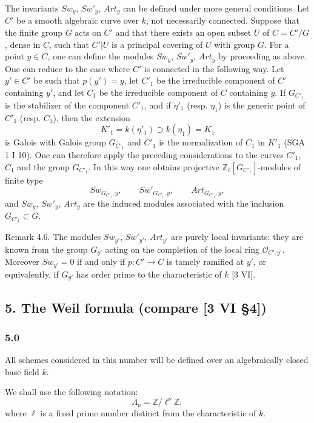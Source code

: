 \documentclass[11pt]{article}
\begin{document}
The invariants $Sw_y$, $Sw'_y$, $Art_y$ can be defined under more general conditions. Let $C'$ be a smooth algebraic curve over $k$, not necessarily connected. Suppose that the finite group $G$ acts on $C'$ and that there exists an open subset $U$ of $C=C'/G$, dense in $C$, such that $C'|U$ is a principal covering of $U$ with group $G$. For a point $y\in C$, one can define the modules $Sw_y$, $Sw'_y$, $Art_y$ by proceeding as above. One can reduce to the case where $C'$ is connected in the following way. Let $y'\in C'$ be such that $p(y')=y$, let $C'_1$ be the irreducible component of $C'$ containing $y'$, and let $C_1$ be the irreducible component of $C$ containing $y$. If $G_{C'_1}$ is the stabilizer of the component $C'_1$, and if $\eta'_1$ (resp. $\eta_1$) is the generic point of $C'_1$ (resp. $C_1$), then the extension
\[
K'_1=k(\eta'_1)\supset k(\eta_1)=K_1
\]
is Galois with Galois group $G_{C'_1}$ and $C'_1$ is the normalization of $C_1$ in $K'_1$ (SGA 1 I 10). One can therefore apply the preceding considerations to the curves $C'_1$, $C_1$ and the group $G_{C'_1}$. In this way one obtains projective $\mathbb Z_\ell[G_{C'_1}]$-modules of finite type
\[
Sw_{G_{C'_1},y},\qquad Sw'_{G_{C'_1},y},\qquad Art_{G_{C'_1},y},
\]
and $Sw_y$, $Sw'_y$, $Art_y$ are the induced modules associated with the inclusion $G_{C'_1}\subset G$.

\label{sga5:X:remark:4.6}Remark 4.6. The modules $Sw_{y'}$, $Sw'_{y'}$, $Art_{y'}$ are purely local invariants: they are known from the group $G_{y'}$ acting on the completion of the local ring $\mathcal O_{C',y'}$. Moreover $Sw_{y'}=0$ if and only if $p:C'\to C$ is tamely ramified at $y'$, or equivalently, if $G_{y'}$ has order prime to the characteristic of $k$ [3 VI].

\subsection*{5. The Weil formula (compare [3 VI §4])}\label{sga5:X:subsection:5}

\subsubsection*{5.0}\label{sga5:X:subsubsection:5.0}

All schemes considered in this number will be defined over an algebraically closed base field $k$.

We shall use the following notation:
\[
\Lambda_\nu=\mathbb Z/\ell^\nu\mathbb Z,
\]
where $\ell$ is a fixed prime number distinct from the characteristic of $k$.
\end{document}
